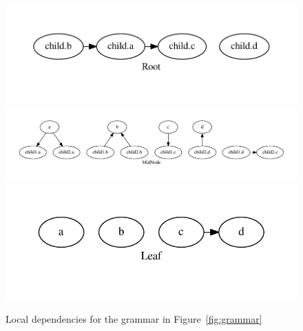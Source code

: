 \documentclass[10pt]{article}
\begin{document}
    \begin{figure}[h]
        \begin{center}
            \includegraphics[scale=0.4]{root} \\
            \includegraphics[scale=0.4]{midnode} \\
            \includegraphics[scale=0.4]{leaf} \\
        \end{center}

        \caption{Local dependencies for the grammar in Figure~\ref{fig:grammar}}
        \label{fig:local}
    \end{figure}
\end{document}
